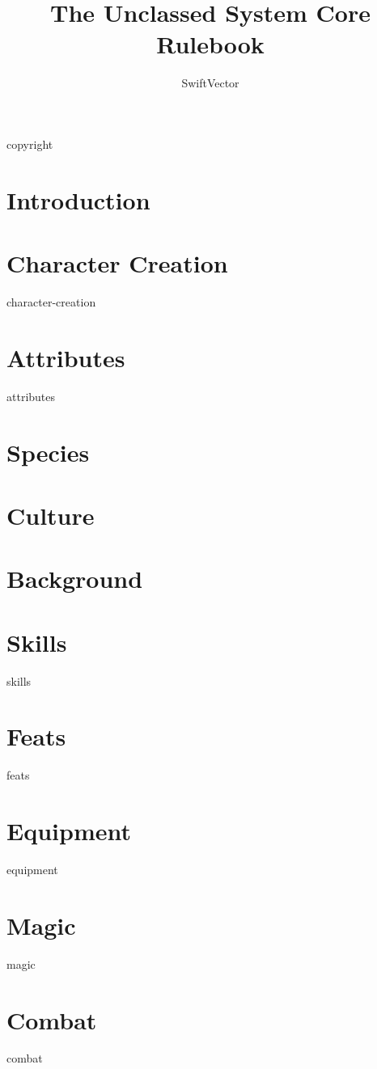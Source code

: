 \documentclass[9pt]{extbook}
\title{The Unclassed System Core Rulebook}
\author{SwiftVector}
\begin{document}
\maketitle

\frontmatter

{copyright}

\tableofcontents

\mainmatter
\chapter{Introduction}


\chapter{Character Creation}
{character-creation}

\chapter{Attributes}\label{attributes}
{attributes}

\chapter{Species}\label{species}


\chapter{Culture}\label{culture}


\chapter{Background}\label{background}


\chapter{Skills}\label{skills}
{skills}

\chapter{Feats}\label{feats}
{feats}

\chapter{Equipment}\label{equipment}
{equipment}

\chapter{Magic}\label{magic}
{magic}


\chapter{Combat}\label{combat}
{combat}

\backmatter

\printindex

\glsaddallunused
\printglossary[type=\acronymtype]
\printglossary
\end{document}

